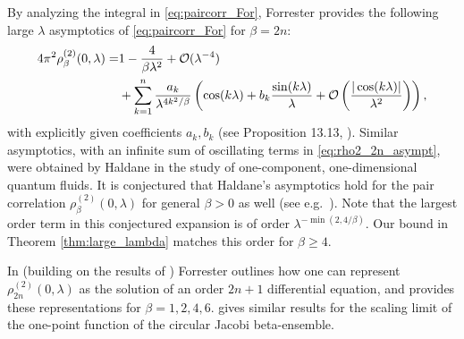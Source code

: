\documentclass[12pt]{article}
\theoremstyle{definition} %
\theoremstyle{remark} %
\newcommand{\benedek}[1]{\textcolor{red}{\tt{#1}}}
\newcommand{\yahui}[1]{\textcolor{blue}{\tt{#1}}}
\begin{document}


By analyzing the integral in \eqref{eq:paircorr_For},
Forrester provides the following large $\lambda$ asymptotics of \eqref{eq:paircorr_For} for $\beta=2n$:
\begin{align}\notag
4\pi^2    \rho_{\beta}^{(2)}(0,\lambda)=&1-\frac{4}{\beta \lambda^2}+\mathcal{O}(\lambda^{-4})\\
&+\sum_{k=1}^{n}\frac{a_k}{\lambda^{4k^2/\beta}}\left(\cos(k \lambda)+b_k\frac{\sin(k\lambda)}{\lambda}+\mathcal{O}\left(\frac{|\cos(k\lambda)|}{\lambda^2}\right)\right)\label{eq:rho2_2n_asympt},
\end{align}
with explicitly given coefficients $a_k, b_k$ (see Proposition 13.13, \cite{ForBook}).
Similar asymptotics, with an infinite sum of oscillating terms in \eqref{eq:rho2_2n_asympt}, 
were obtained by Haldane \cite{Haldane1981}
in the study of one-component, one-dimensional quantum fluids. It is conjectured that Haldane's asymptotics hold 
for the pair correlation $\rho_{\beta}^{(2)}(0,\lambda)$ for general $\beta>0$ as well (see e.g.~\cite{Forrester_1984}). Note that the largest order term in this conjectured expansion is of order $\lambda^{-\min(2,4/\beta)}$. Our bound in Theorem \ref{thm:large_lambda} matches this order for $\beta\ge 4$. 


In \cite{Forrester_20212} (building on the results of \cite{FR2012}) Forrester outlines how one can represent $\rho_{2n}^{(2)}(0,\lambda)$ as the solution of an order $2n+1$ differential equation, and provides these representations for $\beta=1,2,4,6$. \cite{Forrester_2021} gives similar results for the scaling limit of the one-point function of the circular Jacobi beta-ensemble.  









\end{document}
